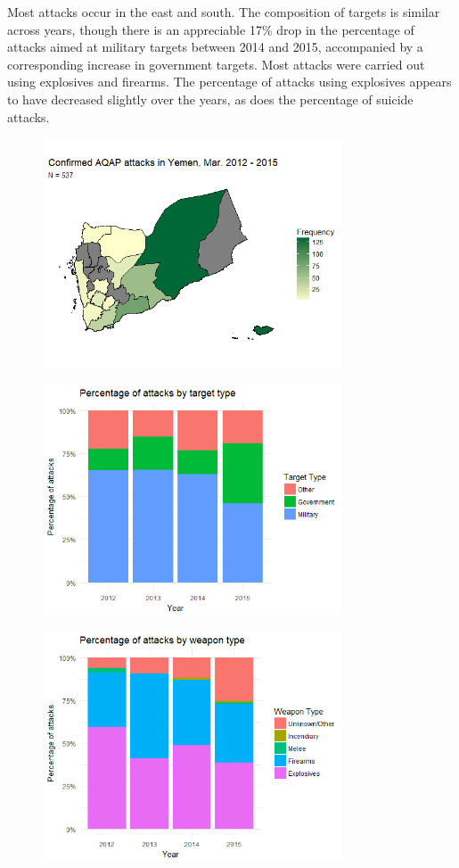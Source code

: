 \documentclass[letterpaper,12pt]{article}
\theoremstyle{definition}
\begin{document}
Most attacks occur in the east and south. The composition of targets is similar across years, though there is an appreciable 17\% drop in the percentage of attacks aimed at military targets between 2014 and 2015, accompanied by a corresponding increase in government targets. Most attacks were carried out using explosives and firearms. The percentage of attacks using explosives appears to have decreased slightly over the years, as does the percentage of suicide attacks.

\begin{figure}[htb!]
  \includegraphics[width=3.5in]{attack_map.png}
\end{figure}

\begin{figure}[htb!]
  \includegraphics[width=3.5in]{attack_target.png}
\end{figure}

\begin{figure}[htb!]
  \includegraphics[width=3.5in]{attack_weapon.png}
\end{figure}
\end{document}
